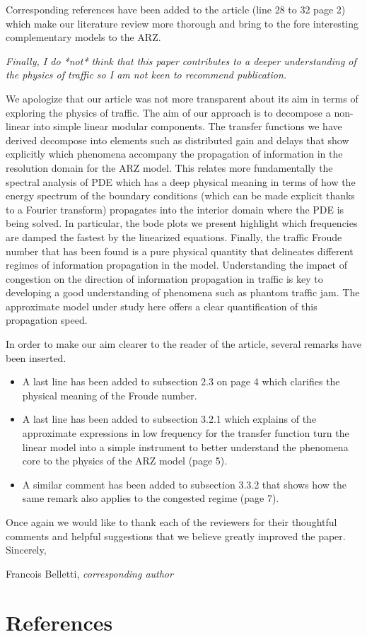 \documentclass{article}
\begin{document}
Corresponding references have been added to the article (line 28 to 32 page 2) which make our literature review more thorough and bring to the fore interesting complementary models to the ARZ.


\bigskip{}
\emph{
Finally, I do *not* think that this paper contributes to a deeper understanding of the physics of traffic so I am not keen to recommend publication.
}

We apologize that our article was not more transparent about its aim in terms of exploring the physics of traffic. The aim of our approach is to decompose a non-linear into simple linear modular components. The transfer functions we have derived decompose into elements such as distributed gain and delays that show explicitly which phenomena accompany the propagation of information in the resolution domain for the ARZ model.
This relates more fundamentally the spectral analysis of PDE which has a deep physical meaning in terms of how the energy spectrum of the boundary conditions (which can be made explicit thanks to a Fourier transform) propagates into the interior domain where the PDE is being solved. In particular, the bode plots we present highlight which frequencies are damped the fastest by the linearized equations. Finally, the traffic Froude number that has been found is a pure physical quantity that delineates different regimes of information propagation in the model. Understanding the impact of congestion on the direction of information propagation in traffic is key to developing a good understanding of phenomena such as phantom traffic jam. The approximate model under study here offers a clear quantification of this propagation speed.

In order to make our aim clearer to the reader of the article, several remarks have been inserted.
\begin{itemize}
\item A last line has been added to subsection 2.3 on page 4 which clarifies the physical meaning of the Froude number.
\item A last line has been added to subsection 3.2.1 which explains of the approximate expressions in low frequency for the transfer function turn the linear model into a simple instrument to better understand the phenomena core to the physics of the ARZ model (page 5).
\item A similar comment has been added to subsection 3.3.2 that shows how the same remark also applies to the congested regime (page 7).
\end{itemize}

\newpage

Once again we would like to thank each of the reviewers for their
thoughtful comments and helpful suggestions that we believe greatly improved the paper.\\

Sincerely,
\bigskip{}

\hfill Francois Belletti, \emph{corresponding author}\\


\section*{References}

\end{document}
